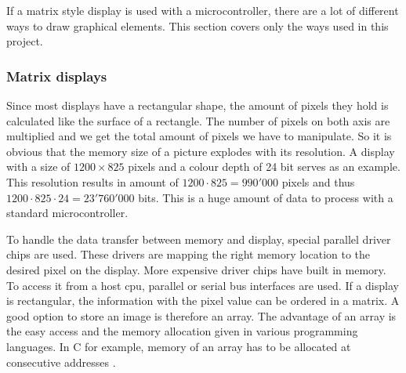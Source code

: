 
If a matrix style display is used with a microcontroller, there are a lot of different ways to draw graphical elements. This section covers only the ways used in this project. 

\subsubsection{Matrix displays}
Since most displays have a rectangular shape, the amount of pixels they hold is calculated like the surface of a rectangle. The number of pixels on both axis are multiplied and we get the total amount of pixels we have to manipulate. So it is obvious that the memory size of a picture explodes with its resolution. A display with a size of $1200 \times 825$ pixels and a colour depth of 24 bit serves as an example. This resolution results in amount of $1200\cdot825=990'000$ pixels and thus $1200\cdot825\cdot24=23'760'000$ bits. This is a huge amount of data to process with a standard microcontroller.

To handle the data transfer between memory and display, special parallel driver chips are used. These drivers are mapping the right memory location to the desired pixel on the display. More expensive driver chips have built in memory. To access it from a host \acs{cpu}, parallel or serial bus interfaces are used. If a display is rectangular, the information with the pixel value can be ordered in a matrix.
A good option to store an image is therefore an array.
The advantage of an array is the easy access and the memory allocation given in various programming languages.
In C for example, memory of an array has to be allocated at consecutive addresses \cite{ISO/IEC9899}.
 





